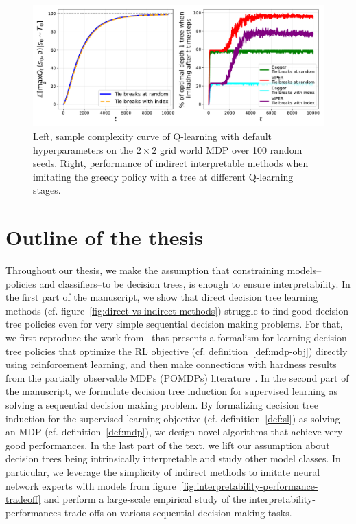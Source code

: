 \begin{figure}
    \centering
    \includegraphics[width=1\textwidth]{images/images_part1/base_mdp.pdf}
    \caption{Left, sample complexity curve of Q-learning with default hyperparameters on the $2\times 2$ grid world MDP over 100 random seeds. Right, performance of indirect interpretable methods when imitating the greedy policy with a tree at different Q-learning stages.}\label{fig:ql-il}
\end{figure}

\section{Outline of the thesis}
Throughout our thesis, we make the assumption that constraining models--policies and classifiers--to be decision trees, is enough to ensure interpretability.
In the first part of the manuscript, we show that direct decision tree learning methods (cf. figure~\ref{fig:direct-vs-indirect-methods}) struggle to find good decision tree policies even for very simple sequential decision making problems.
For that, we first reproduce the work from~\cite{topin2021iterative} that presents a formalism for learning decision tree policies that optimize the RL objective (cf. definition~\ref{def:mdp-obj}) directly using reinforcement learning, and then make connections with hardness results from the partially observable MDPs (POMDPs) literature~\cite{POMDP,chap2}.
In the second part of the manuscript, we formulate decision tree induction for supervised learning as solving a sequential decision making problem.
By formalizing decision tree induction for the supervised learning objective (cf. definition~\ref{def:sl}) as solving an MDP (cf. definition~\ref{def:mdp}), we design novel algorithms that achieve very good performances.
In the last part of the text, we lift our assumption about decision trees being intrinsically interpretable and study other model classes.
In particular, we leverage the simplicity of indirect methods to imitate neural network experts with models from figure~\ref{fig:interpretability-performance-tradeoff} and perform a large-scale empirical study of the interpretability-performances trade-offs on various sequential decision making tasks.

